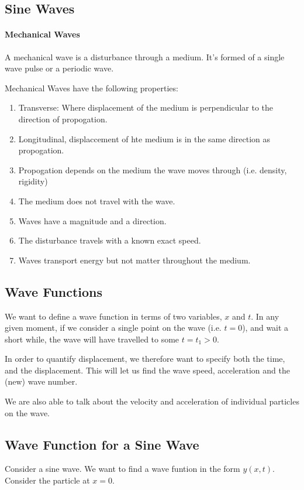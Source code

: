 
\subsection*{Sine Waves}
\paragraph{Mechanical Waves} A mechanical wave is a disturbance through a medium. It's formed of a single wave pulse or a periodic wave. 

Mechanical Waves have the following properties:
\begin{enumerate}
    \item Transverse: Where displacement of the medium is perpendicular to the direction of propogation.
    \item Longitudinal, displaccement of hte medium is in the same direction as propogation.
    \item Propogation depends on the medium the wave moves through (i.e. density, rigidity)
    \item The medium does not travel with the wave.
    \item Waves have a magnitude and a direction.
    \item The disturbance travels with a known exact speed.
    \item Waves transport energy but not matter throughout the medium.
\end{enumerate}


\subsection*{Wave Functions}

We want to define a wave function in terms of two variables, $x$ and $t$. In any given moment, if we consider a single point on the wave (i.e. $t = 0$), and wait a short while, the wave will have travelled to some $t = t_1 > 0$.

In order to quantify displacement, we therefore want to specify both the time, and the displacement. This will let us find the wave speed, acceleration and the (new) wave number.

We are also able to talk about the velocity and acceleration of individual particles on the wave.

\subsection*{Wave Function for a Sine Wave}
Consider a sine wave. We want to find a wave funtion in the form $y(x, t)$. Consider the particle at $x = 0$.

